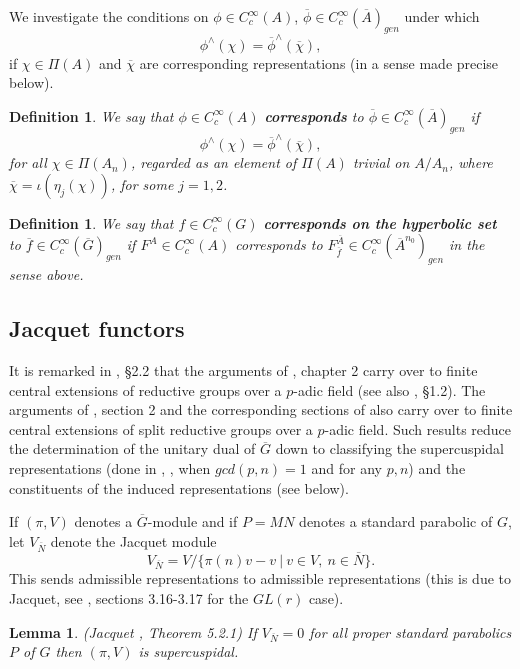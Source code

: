 \documentclass[twocolumn,10pt]{article}
\newtheorem{lemma}[theorem]{Lemma}
\newtheorem{definition}[theorem]{Definition}
\begin{document}
We investigate the conditions on $\phi \in C_c^\infty(A)$,
$\overline{\phi}
\in C_c^\infty(\overline{A})_{gen}$
under which
\[
\phi^{\wedge}(\chi)=
\overline{\phi}^{\wedge}(\overline{\chi}),
\]
if $\chi \in \Pi(A)$ and $\overline{\chi}$ are
corresponding representations (in a sense made 
precise below).

\begin{definition} We say that
$\phi \in C_c^\infty(A)$ {\bf corresponds} to
$\overline{\phi}
\in C_c^\infty(\overline{A})_{gen}$
if
\[
\phi^{\wedge}(\chi)=
\overline{\phi}^{\wedge}(\overline{\chi}),
\]
for all $\chi \in \Pi(A_n)$, regarded as an element of
$\Pi(A)$ trivial on $A/A_n$, where $\overline{\chi}=
\iota(\eta_j(\chi))$, for some $j=1,2$.
\end{definition}

\begin{definition} We say that
$f \in C_c^\infty(G)$ {\bf corresponds 
on the hyperbolic set} to
$\overline{f}\in C_c^\infty(\overline{G})_{gen}$
if $F^A\in C_c^\infty(A)$ corresponds to
$F^{\overline{A}}_{\overline{f}}\in C_c^\infty(\overline{A}^{n_0})_{gen}$
in the sense above.
\end{definition}


\subsection{Jacquet functors}

It is remarked in \cite{BD}, \S 2.2
that the arguments of \cite{BZ1}, chapter 2 carry
over to finite central extensions of reductive groups 
over a $p$-adic field (see also \cite{KP}, \S 1.2).
The arguments of \cite{BZ2}, section 2 and
the corresponding sections of \cite{Ca} also
carry over to finite central extensions
of split reductive groups over a $p$-adic field. 
Such results reduce
the determination of the unitary dual of $\overline{G}$
down to classifying the supercuspidal representations (done in \cite{M1}, 
\cite{M2}, \cite{J3} when $gcd(p,n)=1$ and
\cite{J2} for any $p,n$) and the constituents of the
induced representations (see below). 

If $(\pi ,V)$ denotes a $\overline{G}$-module and if 
$P=MN$ denotes a standard parabolic of $G$, let $V_{\overline{N}}$ 
denote the Jacquet module 
\[
V_{\overline{N}}=V/\{\pi (n)v-v\ |\ v\in V,\ n\in \overline{N}\}. 
\]
This sends admissible representations to admissible 
representations (this is
due to Jacquet, see \cite{BZ1}, sections 3.16-3.17
for the $GL(r)$ case).

\begin{lemma}
(Jacquet \cite{Ca}, Theorem 5.2.1)
If $V_{\overline{N}}=0$ for all proper
standard parabolics $P$ of $G$ then $(\pi ,V)$ is supercuspidal.
\end{lemma}
\end{document}
